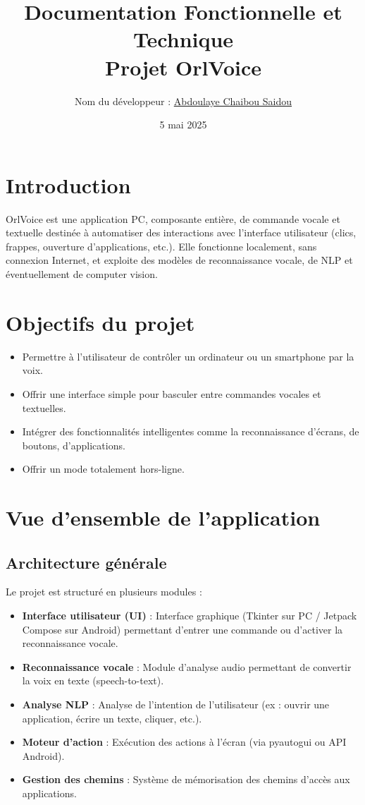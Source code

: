 \documentclass[12pt]{article}
\title{Documentation Fonctionnelle et Technique \\ \smallskip \large Projet OrlVoice}
\author{Nom du développeur : \underline{ Abdoulaye Chaibou Saidou\hspace{1.5cm}}}
\date{5 mai 2025}
\begin{document}
	
	\maketitle
	\tableofcontents
	\newpage
	
	\section{Introduction}
	OrlVoice est une application PC, composante entière, de commande vocale et textuelle destinée à automatiser des interactions avec l’interface utilisateur (clics, frappes, ouverture d’applications, etc.).  
	Elle fonctionne localement, sans connexion Internet, et exploite des modèles de reconnaissance vocale, de NLP et éventuellement de computer vision.
	
	\section{Objectifs du projet}
	\begin{itemize}
		\item Permettre à l’utilisateur de contrôler un ordinateur ou un smartphone par la voix.
		\item Offrir une interface simple pour basculer entre commandes vocales et textuelles.
		\item Intégrer des fonctionnalités intelligentes comme la reconnaissance d’écrans, de boutons, d’applications.
		\item Offrir un mode totalement hors-ligne.
	\end{itemize}
	
	\section{Vue d'ensemble de l'application}
	\subsection{Architecture générale}
	Le projet est structuré en plusieurs modules :
	\begin{itemize}
		\item \textbf{Interface utilisateur (UI)} : Interface graphique (Tkinter sur PC / Jetpack Compose sur Android) permettant d’entrer une commande ou d’activer la reconnaissance vocale.
		\item \textbf{Reconnaissance vocale} : Module d’analyse audio permettant de convertir la voix en texte (speech-to-text).
		\item \textbf{Analyse NLP} : Analyse de l’intention de l’utilisateur (ex : ouvrir une application, écrire un texte, cliquer, etc.).
		\item \textbf{Moteur d’action} : Exécution des actions à l’écran (via pyautogui ou API Android).
		\item \textbf{Gestion des chemins} : Système de mémorisation des chemins d’accès aux applications.
	\end{itemize}
	
\end{document}
